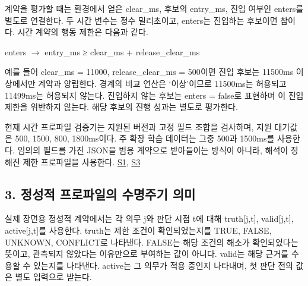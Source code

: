 \documentclass[11pt,a4paper]{article}
\begin{document}
계약을 평가할 때는 환경에서 얻은 {\ttfamily\small clear\_\allowbreak{}ms}, 후보의 {\ttfamily\small entry\_\allowbreak{}ms}, 진입 여부인 {\ttfamily\small enters}를 별도로 연결한다. 두 시간 변수는 정수 밀리초이고, {\ttfamily\small enters}는 진입하는 후보이면 참이다. 시간 계약의 행동 제한은 다음과 같다.\par

{\ttfamily\small enters \ensuremath{\rightarrow} entry\_\allowbreak{}ms ≥ clear\_\allowbreak{}ms + release\_\allowbreak{}clear\_\allowbreak{}ms}\par

예를 들어 {\ttfamily\small clear\_\allowbreak{}ms = 11000}, {\ttfamily\small release\_\allowbreak{}clear\_\allowbreak{}ms = 500}이면 진입 후보는 11500ms 이상에서만 계약과 양립한다. 경계의 비교 연산은 ‘이상’이므로 11500ms는 허용되고 11499ms는 허용되지 않는다. 진입하지 않는 후보는 {\ttfamily\small enters = false}로 표현하며 이 진입 제한을 위반하지 않는다. 해당 후보의 진행 성과는 별도로 평가한다.\par

현재 시간 프로파일 검증기는 지원된 버전과 고정 필드 조합을 검사하며, 지원 대기값은 500, 1500, 800, 1800ms이다. 주 확장 학습 데이터는 그중 500과 1500ms를 사용한다. 임의의 필드를 가진 JSON을 범용 계약으로 받아들이는 방식이 아니라, 해석이 정해진 제한 프로파일을 사용한다. \href{\detokenize{../../../../../../projects/04-guardsynth-coc/experiments/paper1_cnl_learning/temporal_preservation.py}}{S1}, \href{\detokenize{../../../../../../projects/04-guardsynth-coc/experiments/paper1_cnl_learning/temporal_training_data.py}}{S3}\par

\subsection*{3. 정성적 프로파일의 수명주기 의미}

실제 장면용 정성적 계약에서는 각 의무 j와 판단 시점 t에 대해 {\ttfamily\small truth[j,t]}, {\ttfamily\small valid[j,t]}, {\ttfamily\small active[j,t]}를 사용한다. {\ttfamily\small truth}는 제한 조건이 확인되었는지를 TRUE, FALSE, UNKNOWN, CONFLICT로 나타낸다. FALSE는 해당 조건의 해소가 확인되었다는 뜻이고, 관측되지 않았다는 이유만으로 부여하는 값이 아니다. {\ttfamily\small valid}는 해당 근거를 수용할 수 있는지를 나타낸다. {\ttfamily\small active}는 그 의무가 적용 중인지 나타내며, 첫 판단 전의 값은 별도 입력으로 받는다.\par
\end{document}
